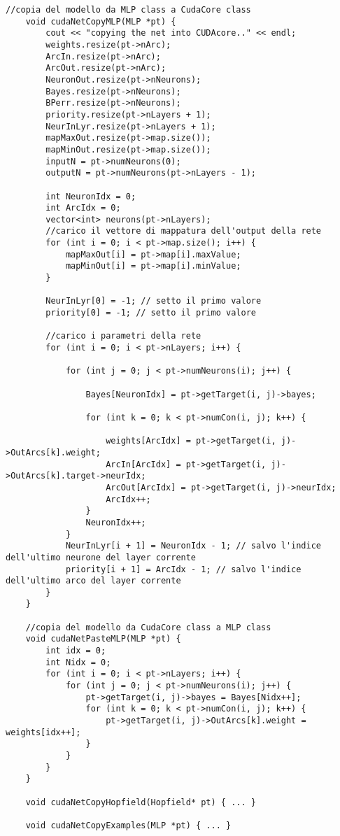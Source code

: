 \documentclass[10pt,a4paper]{article}
\begin{document}
\begin{lstlisting}[style=mycuda, caption= classe di interfaccia alla GPU, captionpos=b]
	//copia del modello da MLP class a CudaCore class
	void cudaNetCopyMLP(MLP *pt) {
		cout << "copying the net into CUDAcore.." << endl;
		weights.resize(pt->nArc);
		ArcIn.resize(pt->nArc);
		ArcOut.resize(pt->nArc);
		NeuronOut.resize(pt->nNeurons);
		Bayes.resize(pt->nNeurons);
		BPerr.resize(pt->nNeurons);
		priority.resize(pt->nLayers + 1);
		NeurInLyr.resize(pt->nLayers + 1);
		mapMaxOut.resize(pt->map.size());
		mapMinOut.resize(pt->map.size());
		inputN = pt->numNeurons(0);
		outputN = pt->numNeurons(pt->nLayers - 1);

		int NeuronIdx = 0;
		int ArcIdx = 0;
		vector<int> neurons(pt->nLayers);
		//carico il vettore di mappatura dell'output della rete
		for (int i = 0; i < pt->map.size(); i++) {
			mapMaxOut[i] = pt->map[i].maxValue;
			mapMinOut[i] = pt->map[i].minValue;
		}

		NeurInLyr[0] = -1; // setto il primo valore 
		priority[0] = -1; // setto il primo valore 

		//carico i parametri della rete
		for (int i = 0; i < pt->nLayers; i++) {

			for (int j = 0; j < pt->numNeurons(i); j++) {

				Bayes[NeuronIdx] = pt->getTarget(i, j)->bayes;

				for (int k = 0; k < pt->numCon(i, j); k++) {

					weights[ArcIdx] = pt->getTarget(i, j)->OutArcs[k].weight;
					ArcIn[ArcIdx] = pt->getTarget(i, j)->OutArcs[k].target->neurIdx;
					ArcOut[ArcIdx] = pt->getTarget(i, j)->neurIdx;
					ArcIdx++;
				}
				NeuronIdx++;
			}
			NeurInLyr[i + 1] = NeuronIdx - 1; // salvo l'indice dell'ultimo neurone del layer corrente
			priority[i + 1] = ArcIdx - 1; // salvo l'indice dell'ultimo arco del layer corrente
		}
	}
	
	//copia del modello da CudaCore class a MLP class
	void cudaNetPasteMLP(MLP *pt) {
		int idx = 0;
		int Nidx = 0;
		for (int i = 0; i < pt->nLayers; i++) {
			for (int j = 0; j < pt->numNeurons(i); j++) {
				pt->getTarget(i, j)->bayes = Bayes[Nidx++];
				for (int k = 0; k < pt->numCon(i, j); k++) {
					pt->getTarget(i, j)->OutArcs[k].weight = weights[idx++];
				}
			}
		}
	}

	void cudaNetCopyHopfield(Hopfield* pt) { ... }

	void cudaNetCopyExamples(MLP *pt) { ... }
	
\end{lstlisting}
\end{document}
